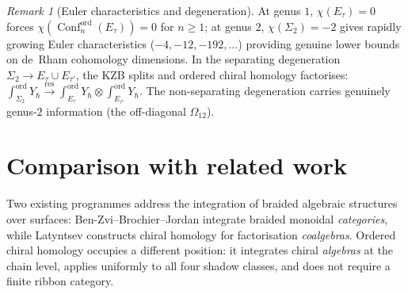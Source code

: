 \documentclass[11pt,reqno]{amsart}
\theoremstyle{definition}
\theoremstyle{remark}
\newtheorem{remark}[theorem]{Remark}
\DeclareMathOperator{\Conf}{Conf}
\numberwithin{equation}{section}
\begin{document}
\begin{remark}[Euler characteristics and degeneration]
\label{rem:g2-nonvanishing-chi}
\label{rem:g2-degeneration}
At genus $1$, $\chi(E_\tau) = 0$ forces
$\chi(\Conf_n^{\mathrm{ord}}(E_\tau)) = 0$ for $n \geq 1$;
at genus $2$, $\chi(\Sigma_2) = -2$ gives rapidly growing
Euler characteristics ($-4, -12, -192, \ldots$) providing
genuine lower bounds on de~Rham cohomology dimensions.
In the separating degeneration
$\Sigma_2 \to E_\tau \cup E_{\tau'}$, the KZB splits and
ordered chiral homology factorises:
$\int_{\Sigma_2}^{\mathrm{ord}} Y_\hbar
\xrightarrow{\mathrm{res}}
\int_{E_\tau}^{\mathrm{ord}} Y_\hbar
\otimes
\int_{E_{\tau'}}^{\mathrm{ord}} Y_\hbar$.
The non-separating degeneration carries genuinely genus-$2$
information (the off-diagonal $\Omega_{12}$).
\end{remark}


\section{Comparison with related work}
\label{sec:comparison}

Two existing programmes address the integration of braided
algebraic structures over surfaces:
Ben-Zvi--Brochier--Jordan integrate braided monoidal
\emph{categories}, while Latyntsev constructs chiral
homology for factorisation \emph{coalgebras}. Ordered chiral
homology occupies a different position: it integrates chiral
\emph{algebras} at the chain level, applies uniformly to all
four shadow classes, and does not require a finite ribbon
category.
\end{document}
